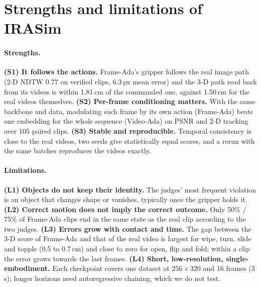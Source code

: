 \section{Strengths and limitations of IRASim}
\label{sec:analysis}


\paragraph{Strengths.}
\textbf{(S1) It follows the actions.}
Frame-Ada's gripper follows the real image path (2-D NDTW 0.77 on verified clips, 6.3\,px mean error) and the 3-D path read back from its videos is within 1.81\,cm of the commanded one, against 1.50\,cm for the real videos themselves.
\textbf{(S2) Per-frame conditioning matters.}
With the same backbone and data, modulating each frame by its own action (Frame-Ada) beats one embedding for the whole sequence (Video-Ada) on PSNR and 2-D tracking over 105 paired clips.
\textbf{(S3) Stable and reproducible.}
Temporal consistency is close to the real videos, two seeds give statistically equal scores, and a rerun with the same batches reproduces the videos exactly.

\paragraph{Limitations.}
\textbf{(L1) Objects do not keep their identity.}
The judges' most frequent violation is an object that changes shape or vanishes, typically once the gripper holds it.
\textbf{(L2) Correct motion does not imply the correct outcome.}
Only 50\% / 75\% of Frame-Ada clips end in the same state as the real clip according to the two judges.
\textbf{(L3) Errors grow with contact and time.}
The gap between the 3-D score of Frame-Ada and that of the real video is largest for wipe, turn, slide and topple (0.5 to 0.7\,cm) and close to zero for open, flip and fold; within a clip the error grows towards the last frames.
\textbf{(L4) Short, low-resolution, single-embodiment.}
Each checkpoint covers one dataset at $256\times320$ and 16 frames (3\,s); longer horizons need autoregressive chaining, which we do not test.
